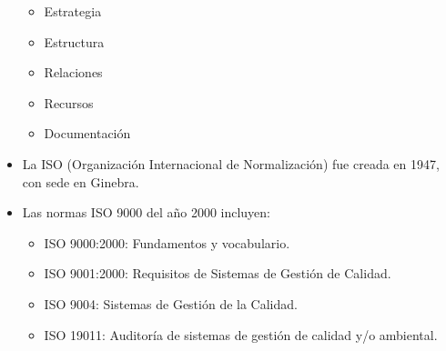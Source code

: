 \documentclass{article} %
\begin{document}
\begin{itemize}[label={},left=0pt,align=parleft]
    \begin{itemize}[label={},left=1em,align=parleft]
        \item \begin{highlightbox}[leveltwo] Estrategia \end{highlightbox}
        \item \begin{highlightbox}[leveltwo] Estructura \end{highlightbox}
        \item \begin{highlightbox}[leveltwo] Relaciones \end{highlightbox}
        \item \begin{highlightbox}[leveltwo] Recursos \end{highlightbox}
        \item \begin{highlightbox}[leveltwo] Documentación \end{highlightbox}
    \end{itemize}
    \item \begin{highlightbox}[levelone] La ISO (Organización Internacional de Normalización) fue creada en 1947, con sede en Ginebra. \end{highlightbox}
    \item \begin{highlightbox}[levelone] Las normas ISO 9000 del año 2000 incluyen: \end{highlightbox}
    \begin{itemize}[label={},left=1em,align=parleft]
        \item \begin{highlightbox}[leveltwo] ISO 9000:2000: Fundamentos y vocabulario. \end{highlightbox}
        \item \begin{highlightbox}[leveltwo] ISO 9001:2000: Requisitos de Sistemas de Gestión de Calidad. \end{highlightbox}
        \item \begin{highlightbox}[leveltwo] ISO 9004: Sistemas de Gestión de la Calidad. \end{highlightbox}
        \item \begin{highlightbox}[leveltwo] ISO 19011: Auditoría de sistemas de gestión de calidad y/o ambiental. \end{highlightbox}
    \end{itemize}
\end{itemize}
\end{document}
